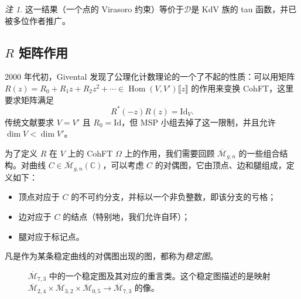 \documentclass{amsart}
\theoremstyle{definition}
\theoremstyle{remark}
\newtheorem{rmk}[thm]{注}
\theoremstyle{plain}
\theoremstyle{definition}
\theoremstyle{remark}
\newcommand{\C}{\mathbb{C}}
\newcommand{\Mbar}{\overline{\mathcal{M}}}
\newcommand{\mc}[1]{\mathcal{#1}}
\newcommand{\mr}[1]{\mathrm{#1}}
\newcommand{\ol}[1]{\overline{#1}}
\newcommand{\1}{\mathbf{1}}
\newcommand{\2}{\mathbf{2}}
\newcommand{\3}{\mathbf{3}}
\newcommand{\ps}[1]{\llbracket #1 \rrbracket}
\DeclareMathOperator{\Hom}{Hom}
\begin{document}
\begin{rmk}
    这一结果（一个点的 Virasoro 约束）等价于$\mc{D}$是 KdV 族的 tau 函数，并已被多位作者推广。
\end{rmk}



\subsection{$R$ 矩阵作用}%
\label{sub:R-matrix action}

2000 年代初，Givental 发现了公理化计数理论的一个了不起的性质：可以用矩阵 $R(z) = R_0 + R_1 z + R_2 z^2 + \cdots \in \Hom(V, V')\ps{z}$ 的作用来变换 CohFT，这里要求矩阵满足
\[ R^*(-z) R(z) = \mr{Id}_V. \]
传统文献要求 $V = V'$ 且 $R_0 = \mr{Id}$，但 MSP 小组去掉了这一限制，并且允许 $\dim V < \dim V'$。

为了定义 $R$ 在 $V$ 上的 CohFT $\Omega$ 上的作用，我们需要回顾 $\Mbar_{g,n}$ 的一些组合结构。对曲线 $C\in \Mbar_{g,n}(\C)$，可以考虑 $C$ 的对偶图，它由顶点、边和腿组成，定义如下：
\begin{itemize}
    \item 顶点对应于 $C$ 的不可约分支，并标以一个非负整数，即该分支的亏格；
    \item 边对应于 $C$ 的结点（特别地，我们允许自环）；
    \item 腿对应于标记点。
\end{itemize}
凡是作为某条稳定曲线的对偶图出现的图，都称为\textit{稳定图}。

\begin{figure}[htpb]
  \centering
  \caption{$\ol{\mc{M}}_{7,3}$ 中的一个稳定图及其对应的重言类。这个稳定图描述的是映射
    $\ol{\mc{M}}_{2,4} \times \ol{\mc{M}}_{3,2} \times \ol{\mc{M}}_{0,5} \to \ol{\mc{M}}_{7,3}$ 的像。}
  \label{fig:stablegraph}
\end{figure}
\end{document}

